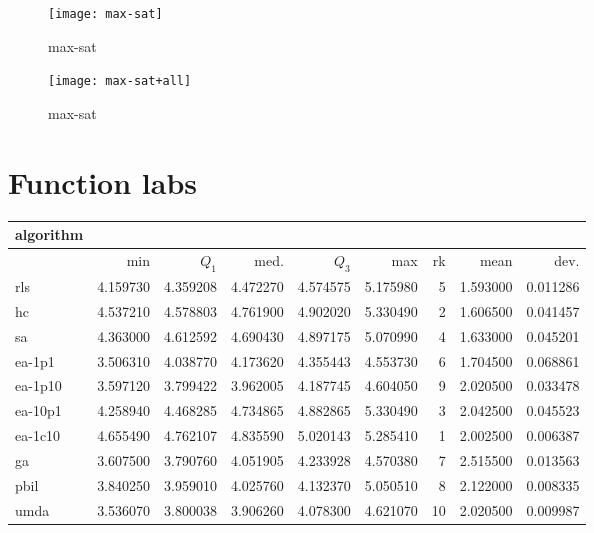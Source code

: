 \begin{center}
\begin{figure}[h]
\centering
\texttt{[image: max-sat]}
\caption{max-sat}
\end{figure}
\end{center}

\begin{center}
\begin{figure}[h]
\centering
\texttt{[image: max-sat+all]}
\caption{max-sat}
\end{figure}
\end{center}

\newpage

\section{Function labs}
\begin{center}
\begin{tabular}{@{}l*{5}{>{{}}N{1}{2}}>{{}}N{2}{0}N{1}{3}N{1}{3}@{}}
\toprule
{algorithm} &  &  \\
\midrule
& {min} & {$Q_1$} & {med.} & {$Q_3$} & {max} & {rk} & {mean} & {dev.} \\
\midrule
rls & 4.159730 & 4.359208 & 4.472270 & 4.574575 & 5.175980 & 5 & 1.593000 & 0.011286 \\
 hc & 4.537210 & 4.578803 & 4.761900 & 4.902020 & {\color{blue}} 5.330490 & 2 & 1.606500 & 0.041457 \\
 sa & 4.363000 & 4.612592 & 4.690430 & 4.897175 & 5.070990 & 4 & 1.633000 & 0.045201 \\
 ea-1p1 & 3.506310 & 4.038770 & 4.173620 & 4.355443 & 4.553730 & 6 & 1.704500 & 0.068861 \\
 ea-1p10 & 3.597120 & 3.799422 & 3.962005 & 4.187745 & 4.604050 & 9 & 2.020500 & 0.033478 \\
 ea-10p1 & 4.258940 & 4.468285 & 4.734865 & 4.882865 & {\color{blue}} 5.330490 & 3 & 2.042500 & 0.045523 \\
 ea-1c10 & {\color{blue}} 4.655490 & {\color{blue}} 4.762107 & {\color{blue}} 4.835590 & {\color{blue}} 5.020143 & 5.285410 & 1 & 2.002500 & 0.006387 \\
 ga & 3.607500 & 3.790760 & 4.051905 & 4.233928 & 4.570380 & 7 & 2.515500 & 0.013563 \\
 pbil & 3.840250 & 3.959010 & 4.025760 & 4.132370 & 5.050510 & 8 & 2.122000 & 0.008335 \\
 umda & 3.536070 & 3.800038 & 3.906260 & 4.078300 & 4.621070 & 10 & 2.020500 & 0.009987 \\
 \bottomrule
\end{tabular}
\end{center}

